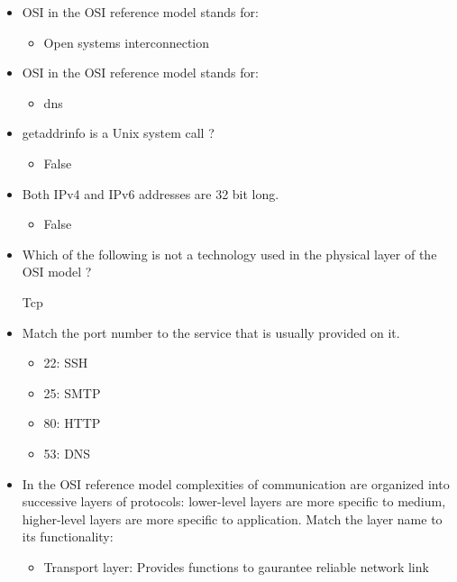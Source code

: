 \documentclass{report}
\begin{document}
    \pagebreak 
    \begin{itemize}
        \item OSI in the OSI reference model stands for:
            \begin{itemize}
                \item Open systems interconnection
            \end{itemize}
        \item OSI in the OSI reference model stands for:
            \begin{itemize}
                \item dns
            \end{itemize}
        \item getaddrinfo is a Unix system call ?
            \begin{itemize}
                \item False
            \end{itemize}
        \item Both IPv4 and IPv6 addresses are 32 bit long.
            \begin{itemize}
                \item False 
            \end{itemize}
        \item Which of the following is not a technology used in the physical layer of the OSI model ?
            \begin{itemize}
                Tcp
            \end{itemize}
            \item Match the port number to the service that is usually provided on it. 
                \begin{itemize}
                    \item 22: SSH
                    \item 25: SMTP
                    \item 80: HTTP
                    \item 53: DNS
                \end{itemize}
        \item In the OSI reference model complexities of communication are organized into successive layers of protocols:  lower-level layers are more specific to medium, higher-level layers are more specific to application. Match the layer name to its functionality:
            \begin{itemize}
                \item Transport layer: Provides functions to gaurantee reliable network link

\end{itemize}
\end{itemize}
\end{document}
